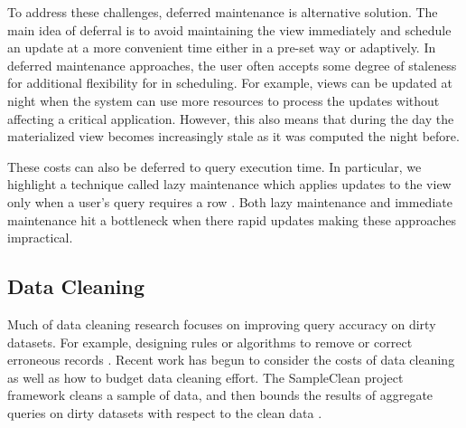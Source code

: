 To address these challenges, deferred maintenance is alternative solution.
The main idea of deferral is to avoid maintaining the view immediately and schedule an update at a more convenient time either in a pre-set way or adaptively.
In deferred maintenance approaches, the user often accepts some degree of staleness for additional flexibility for in scheduling.
For example, views can be updated at night when the system can use more resources to process the updates without affecting a critical application.
However, this also means that during the day the materialized view becomes increasingly stale as it was computed the night before.

These costs can also be deferred to query execution time.
In particular, we highlight a technique called lazy maintenance which applies updates to the view only when a user's query requires a row \cite{zhou2007lazy}.
Both lazy maintenance and immediate maintenance hit a bottleneck when there rapid updates making these approaches impractical.







\subsection{Data Cleaning}
Much of data cleaning research focuses on improving query accuracy on dirty datasets.
For example, designing rules or algorithms to remove or correct erroneous records \cite{rahm2000data}.
Recent work has begun to consider the costs of data cleaning as well as how to budget data cleaning effort.
The SampleClean project framework cleans a sample of data, and then bounds the results of aggregate queries on dirty datasets with respect to the clean data \cite{wang1999sample}.


